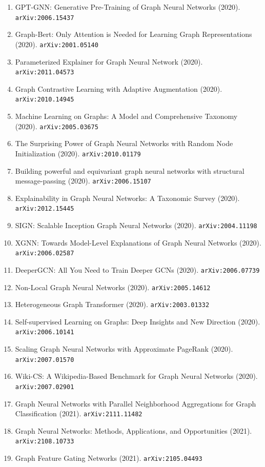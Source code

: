 \documentclass[11pt]{article}
\begin{document}
\begin{enumerate}
  \item GPT-GNN: Generative Pre-Training of Graph Neural Networks (2020). \texttt{arXiv:2006.15437}
  \item Graph-Bert: Only Attention is Needed for Learning Graph Representations (2020). \texttt{arXiv:2001.05140}
  \item Parameterized Explainer for Graph Neural Network (2020). \texttt{arXiv:2011.04573}
  \item Graph Contrastive Learning with Adaptive Augmentation (2020). \texttt{arXiv:2010.14945}
  \item Machine Learning on Graphs: A Model and Comprehensive Taxonomy (2020). \texttt{arXiv:2005.03675}
  \item The Surprising Power of Graph Neural Networks with Random Node
  Initialization (2020). \texttt{arXiv:2010.01179}
  \item Building powerful and equivariant graph neural networks with structural
  message-passing (2020). \texttt{arXiv:2006.15107}
  \item Explainability in Graph Neural Networks: A Taxonomic Survey (2020). \texttt{arXiv:2012.15445}
  \item SIGN: Scalable Inception Graph Neural Networks (2020). \texttt{arXiv:2004.11198}
  \item XGNN: Towards Model-Level Explanations of Graph Neural Networks (2020). \texttt{arXiv:2006.02587}
  \item DeeperGCN: All You Need to Train Deeper GCNs (2020). \texttt{arXiv:2006.07739}
  \item Non-Local Graph Neural Networks (2020). \texttt{arXiv:2005.14612}
  \item Heterogeneous Graph Transformer (2020). \texttt{arXiv:2003.01332}
  \item Self-supervised Learning on Graphs: Deep Insights and New Direction (2020). \texttt{arXiv:2006.10141}
  \item Scaling Graph Neural Networks with Approximate PageRank (2020). \texttt{arXiv:2007.01570}
  \item Wiki-CS: A Wikipedia-Based Benchmark for Graph Neural Networks (2020). \texttt{arXiv:2007.02901}
  \item Graph Neural Networks with Parallel Neighborhood Aggregations for Graph
  Classification (2021). \texttt{arXiv:2111.11482}
  \item Graph Neural Networks: Methods, Applications, and Opportunities (2021). \texttt{arXiv:2108.10733}
  \item Graph Feature Gating Networks (2021). \texttt{arXiv:2105.04493}

\end{enumerate}
\end{document}
